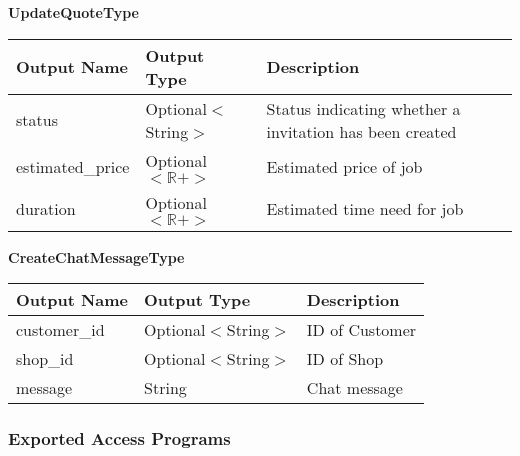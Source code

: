 \documentclass[12pt, titlepage]{article}
\begin{document}
\textbf{UpdateQuoteType}

\begin{table}[H]
	\begin{tabular}{|p{}|p{}|p{}|}
		\hline
		\textbf{Output Name} & \textbf{Output Type}    & \textbf{Description}                                    \\
		\hline
		status               & Optional$<$String$>$    & Status indicating whether a invitation has been created \\
		\hline
		estimated\_price     & Optional$<\mathbb{R}+>$ & Estimated price of job                                  \\
		\hline
		duration             & Optional$<\mathbb{R}+>$ & Estimated time need for job                             \\
		\hline
	\end{tabular}
\end{table}

\textbf{CreateChatMessageType}

\begin{table}[H]
	\begin{tabular}{|p{}|p{}|p{}|}
		\hline
		\textbf{Output Name} & \textbf{Output Type} & \textbf{Description} \\
		\hline
		customer\_id         & Optional$<$String$>$ & ID of Customer       \\
		\hline
		shop\_id             & Optional$<$String$>$ & ID of Shop           \\
		\hline
		message              & String               & Chat message         \\
		\hline
	\end{tabular}
\end{table}

\subsubsection{Exported Access Programs}
\end{document}

